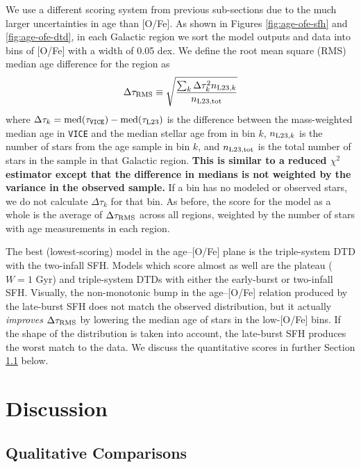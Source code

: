 \documentclass[twocolumn,twocolappendix,linenumbers]{aastex631}
\newcommand{\vice}{{\tt VICE}\xspace}
\begin{document}
We use a different scoring system from previous sub-sections due to the much larger uncertainties in age than [O/Fe]. As shown in Figures \ref{fig:age-ofe-sfh} and \ref{fig:age-ofe-dtd}, in each Galactic region we sort the model outputs and data into bins of [O/Fe] with a width of 0.05 dex. We define the root mean square (RMS) median age difference for the region as
\begin{equation}
    \Delta\tau_{\rm RMS} \equiv \sqrt{\frac{\sum_k \Delta\tau_k^2 n_{{\rm L23},k}}{n_{\rm L23,tot}}}
    \label{eq:age-ofe-score}
\end{equation}
where $\Delta\tau_k=\rm{med}(\tau_{\rm \vice})-\rm{med}(\tau_{\rm L23})$ is the difference between the mass-weighted median age in \vice and the median stellar age from  in bin $k$, $n_{{\rm L23},k}$ is the number of stars from the  age sample in bin $k$, and $n_{\rm L23,tot}$ is the total number of stars in the sample in that Galactic region. {\bf This is similar to a reduced $\chi^2$ estimator except that the difference in medians is not weighted by the variance in the observed sample.} If a bin has no modeled or observed stars, we do not calculate $\Delta \tau_k$ for that bin. As before, the score for the model as a whole is the average of $\Delta \tau_{\rm RMS}$ across all regions, weighted by the number of stars with age measurements in each region.

The best (lowest-scoring) model in the age--[O/Fe] plane is the triple-system DTD with the two-infall SFH. Models which score almost as well are the plateau ($W=1$ Gyr) and triple-system DTDs with either the early-burst or two-infall SFH. Visually, the non-monotonic bump in the age--[O/Fe] relation produced by the late-burst SFH does not match the observed distribution, but it actually {\it improves} $\Delta \tau_{\rm RMS}$ by lowering the median age of stars in the low-[O/Fe] bins. If the shape of the distribution is taken into account, the late-burst SFH produces the worst match to the data.
We discuss the quantitative scores in further Section \ref{sec:discussion-scores} below.

\section{Discussion}
\label{sec:discussion}

\subsection{\bf Qualitative Comparisons}
\label{sec:discussion-scores}
\end{document}
